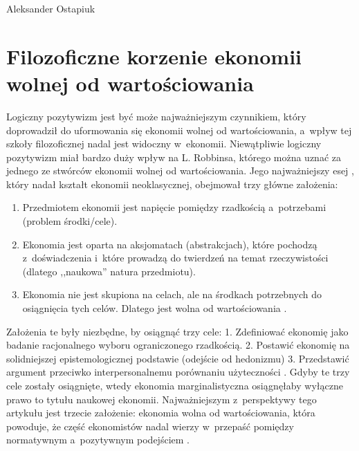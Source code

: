 \begin{artplenv}{Aleksander Ostapiuk}
\section{Filozoficzne korzenie ekonomii wolnej od wartościowania}
Logiczny pozytywizm jest być może najważniejszym czynnikiem, który doprowadził do uformowania się ekonomii wolnej od
wartościowania, a~wpływ tej szkoły filozoficznej nadal jest widoczny w~ekonomii. Niewątpliwie logiczny pozytywizm miał
bardzo duży wpływ na L. Robbinsa, którego można uznać za jednego ze stwórców ekonomii wolnej od wartościowania. Jego
najważniejszy esej
\parencite{robbins_essay_1935},
który nadał kształt ekonomii neoklasycznej, obejmował trzy
główne założenia:

\begin{enumerate}
\item Przedmiotem ekonomii jest napięcie pomiędzy rzadkością a~potrzebami (problem środki/cele).
\item Ekonomia jest oparta na aksjomatach (abstrakcjach), które pochodzą z~doświadczenia i~które prowadzą do twierdzeń
na temat rzeczywistości (dlatego ,,naukowa'' natura przedmiotu). 
\item Ekonomia nie jest skupiona na celach, ale na środkach potrzebnych do osiągnięcia tych celów. Dlatego jest wolna od
wartościowania
\parencite[s.~58]{witztum_ethics_2007}.
\end{enumerate}

Założenia te były niezbędne, by osiągnąć trzy cele: 1. Zdefiniować ekonomię jako badanie racjonalnego wyboru
ograniczonego rzadkością. 2. Postawić ekonomię na solidniejszej epistemologicznej podstawie (odejście od
hedonizmu) 3. Przedstawić argument przeciwko interpersonalnemu porównaniu użyteczności
\parencite{hands_effective_2007}.
Gdyby te trzy cele zostały osiągnięte, wtedy ekonomia marginalistyczna osiągnęłaby wyłączne prawo to tytułu
naukowej ekonomii. Najważniejszym z~perspektywy tego artykułu jest trzecie założenie: ekonomia wolna od wartościowania,
która powoduje, że część ekonomistów nadal wierzy w~przepaść pomiędzy normatywnym a~pozytywnym
podejściem
\parencite{van_dalen_values_2019}.


\end{artplenv}
